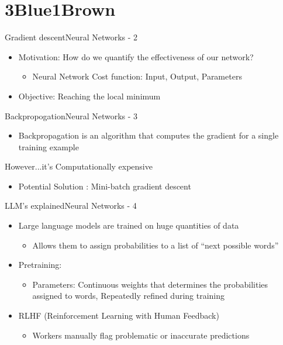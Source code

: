 \documentclass{beamer}
\begin{document}
\section{3Blue1Brown}

\begin{frame}{Gradient descent}{Neural Networks - 2}
\begin{itemize}
    \item Motivation: How do we quantify the effectiveness of our network?
    \begin{itemize}
        \item Neural Network Cost function: Input, Output, Parameters
    \end{itemize}
    \item Objective: Reaching the local minimum
\end{itemize}
\end{frame}

\begin{frame}{Backpropogation}{Neural Networks - 3}
	\begin{itemize}
		\item Backpropagation is an algorithm that computes the gradient for a single training example
	\end{itemize}
	However...it's Computationally expensive
	\begin{itemize}
		\item Potential Solution :  Mini-batch gradient descent
	\end{itemize}
\end{frame}

\begin{frame}{LLM’s explained}{Neural Networks - 4}
	\begin{itemize}
		\item Large language models are trained on huge quantities of data
		\begin{itemize}
			\item Allows them to assign probabilities to a list of “next possible words”
		\end{itemize}
		\item Pretraining:
		\begin{itemize}
			\item Parameters: Continuous weights that determines the probabilities assigned to words, Repeatedly refined during training
		\end{itemize}
	\item RLHF (Reinforcement Learning with Human Feedback)
		\begin{itemize}
			\item Workers manually flag problematic or inaccurate predictions
		\end{itemize}
	\end{itemize}
\end{frame}
\end{document}
